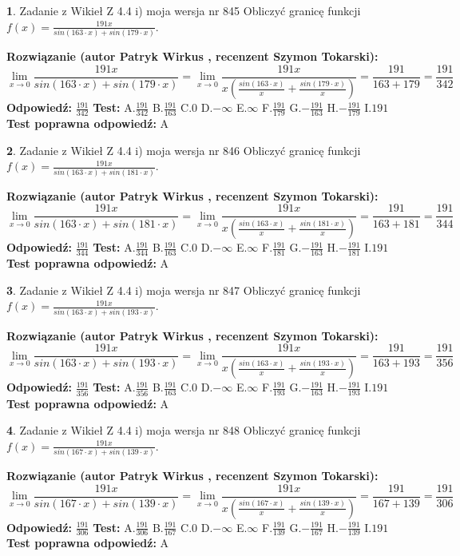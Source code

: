 \documentclass[12pt, a4paper]{article}
\theoremstyle{definition} %
\newtheorem{zad}{}
\newcommand{\zadStart}[1]{\begin{zad}#1\newline}
\newcommand{\zadStop}{\end{zad}}
\newcommand{\rozwStart}[2]{\noindent \textbf{Rozwiązanie (autor #1 , recenzent #2): }\newline}
\newcommand{\rozwStop}{\newline}
\newcommand{\odpStart}{\noindent \textbf{Odpowiedź:}\newline}
\newcommand{\odpStop}{\newline}
\newcommand{\testStart}{\noindent \textbf{Test:}\newline}
\newcommand{\testStop}{\newline}
\newcommand{\kluczStart}{\noindent \textbf{Test poprawna odpowiedź:}\newline}
\newcommand{\kluczStop}{\newline}
\begin{document}
\zadStart{Zadanie z Wikieł Z 4.4 i) moja wersja nr 845}
Obliczyć granicę funkcji $f(x)=\frac{191x}{sin(163\cdot x) +sin(179\cdot x)}$.
\zadStop
\rozwStart{Patryk Wirkus}{Szymon Tokarski}
$$\lim\limits_{x\to 0}\frac{191x}{sin(163\cdot x) +sin(179\cdot x)}=\lim\limits_{x\to 0}\frac{191x}{x(\frac{sin(163\cdot x)}{x}+\frac{sin(179\cdot x)}{x})}=\frac{191}{163+179} = \frac{191}{342}$$
\rozwStop
\odpStart
$\frac{191}{342}$
\odpStop
\testStart
A.$\frac{191}{342}$
B.$\frac{191}{163}$
C.$0$
D.$-\infty$
E.$\infty$
F.$\frac{191}{179}$
G.$-\frac{191}{163}$
H.$-\frac{191}{179}$
I.$191$
\testStop
\kluczStart
A
\kluczStop



\zadStart{Zadanie z Wikieł Z 4.4 i) moja wersja nr 846}
Obliczyć granicę funkcji $f(x)=\frac{191x}{sin(163\cdot x) +sin(181\cdot x)}$.
\zadStop
\rozwStart{Patryk Wirkus}{Szymon Tokarski}
$$\lim\limits_{x\to 0}\frac{191x}{sin(163\cdot x) +sin(181\cdot x)}=\lim\limits_{x\to 0}\frac{191x}{x(\frac{sin(163\cdot x)}{x}+\frac{sin(181\cdot x)}{x})}=\frac{191}{163+181} = \frac{191}{344}$$
\rozwStop
\odpStart
$\frac{191}{344}$
\odpStop
\testStart
A.$\frac{191}{344}$
B.$\frac{191}{163}$
C.$0$
D.$-\infty$
E.$\infty$
F.$\frac{191}{181}$
G.$-\frac{191}{163}$
H.$-\frac{191}{181}$
I.$191$
\testStop
\kluczStart
A
\kluczStop



\zadStart{Zadanie z Wikieł Z 4.4 i) moja wersja nr 847}
Obliczyć granicę funkcji $f(x)=\frac{191x}{sin(163\cdot x) +sin(193\cdot x)}$.
\zadStop
\rozwStart{Patryk Wirkus}{Szymon Tokarski}
$$\lim\limits_{x\to 0}\frac{191x}{sin(163\cdot x) +sin(193\cdot x)}=\lim\limits_{x\to 0}\frac{191x}{x(\frac{sin(163\cdot x)}{x}+\frac{sin(193\cdot x)}{x})}=\frac{191}{163+193} = \frac{191}{356}$$
\rozwStop
\odpStart
$\frac{191}{356}$
\odpStop
\testStart
A.$\frac{191}{356}$
B.$\frac{191}{163}$
C.$0$
D.$-\infty$
E.$\infty$
F.$\frac{191}{193}$
G.$-\frac{191}{163}$
H.$-\frac{191}{193}$
I.$191$
\testStop
\kluczStart
A
\kluczStop



\zadStart{Zadanie z Wikieł Z 4.4 i) moja wersja nr 848}
Obliczyć granicę funkcji $f(x)=\frac{191x}{sin(167\cdot x) +sin(139\cdot x)}$.
\zadStop
\rozwStart{Patryk Wirkus}{Szymon Tokarski}
$$\lim\limits_{x\to 0}\frac{191x}{sin(167\cdot x) +sin(139\cdot x)}=\lim\limits_{x\to 0}\frac{191x}{x(\frac{sin(167\cdot x)}{x}+\frac{sin(139\cdot x)}{x})}=\frac{191}{167+139} = \frac{191}{306}$$
\rozwStop
\odpStart
$\frac{191}{306}$
\odpStop
\testStart
A.$\frac{191}{306}$
B.$\frac{191}{167}$
C.$0$
D.$-\infty$
E.$\infty$
F.$\frac{191}{139}$
G.$-\frac{191}{167}$
H.$-\frac{191}{139}$
I.$191$
\testStop
\kluczStart
A
\kluczStop
\end{document}
